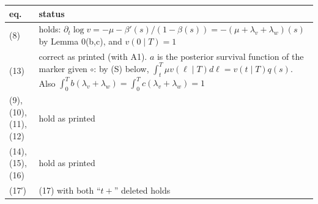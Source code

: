 \documentclass[10pt,]{article}
\begin{document}
\begin{longtable}[]{@{}ll@{}}
\toprule
\begin{minipage}[b]{0.47\columnwidth}\raggedright
eq.\strut
\end{minipage} & \begin{minipage}[b]{0.47\columnwidth}\raggedright
status\strut
\end{minipage}\tabularnewline
\midrule
\endhead
\begin{minipage}[t]{0.47\columnwidth}\raggedright
(8)\strut
\end{minipage} & \begin{minipage}[t]{0.47\columnwidth}\raggedright
holds:
\(\partial_t\log v=-\mu-\beta'(s)/(1-\beta(s))=-(\mu+\lambda_v+\lambda_w)(s)\)
by Lemma 0(b,c), and \(v(0\mid T)=1\)\strut
\end{minipage}\tabularnewline
\begin{minipage}[t]{0.47\columnwidth}\raggedright
(13)\strut
\end{minipage} & \begin{minipage}[t]{0.47\columnwidth}\raggedright
correct as printed (with A1). \(a\) is the posterior survival function
of the marker given \(\circ\): by (S) below,
\(\int_t^T\mu v(\ell\mid T)d\ell=v(t\mid T)q(s)\). Also
\(\int_0^Tb(\lambda_v+\lambda_w)=\int_0^Tc(\lambda_v+\lambda_w)=1\)\strut
\end{minipage}\tabularnewline
\begin{minipage}[t]{0.47\columnwidth}\raggedright
(9), (10), (11), (12)\strut
\end{minipage} & \begin{minipage}[t]{0.47\columnwidth}\raggedright
hold as printed\strut
\end{minipage}\tabularnewline
\begin{minipage}[t]{0.47\columnwidth}\raggedright
(14), (15), (16)\strut
\end{minipage} & \begin{minipage}[t]{0.47\columnwidth}\raggedright
hold as printed\strut
\end{minipage}\tabularnewline
\begin{minipage}[t]{0.47\columnwidth}\raggedright
(17′)\strut
\end{minipage} & \begin{minipage}[t]{0.47\columnwidth}\raggedright
(17) with both ``\(t+\)'' deleted holds\strut
\end{minipage}\tabularnewline
\bottomrule
\end{longtable}
\end{document}
